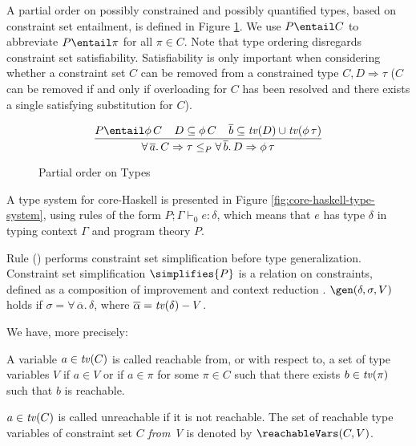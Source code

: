 A partial order on possibly constrained and possibly quantified types,
based on constraint set entailment, is defined in Figure
\ref{fig:type-partial-order}. We use $P \entail C$ to abbreviate
$P\entail \pi$ for all $\pi\in C$.  Note that type ordering disregards
constraint set satisfiability.  Satisfiability is only important when
considering whether a constraint set $C$ can be removed from a
constrained type $C,D \Rightarrow \tau$ ($C$ can be removed if and
only if overloading for $C$ has been resolved and there exists a
single satisfying substitution for
$C$)\cite{JBCS-Ambiguity-and-constrained-polymorphism}.

\begin{figure}
   \[ \begin{array}{ccc}
   	\displaystyle\frac
          {P \entail \phi\,C \:\:\:\:\: D \subseteq \phi\,C \:\:\:\:\: \overline{b} \subseteq \tv(D) \cup \tv(\phi\,\tau) }
          {\forall\,\overline{a}.\,C \Rightarrow \tau \leq_P \forall\,\overline{b}.\,D \Rightarrow \phi\,\tau}
  \end{array} \]
\caption{Partial order on Types}
\label{fig:type-partial-order}
\end{figure}

A type system for core-Haskell is presented in Figure
\ref{fig:core-haskell-type-system}, using rules of the form $P;\Gamma
\vdash_0 e:\delta$, which means that $e$ has type $\delta$ in typing
context $\Gamma$ and program theory $P$.

Rule (\LET) performs constraint set simplification before type
generalization. Constraint set simplification $\simplifies{P}$ is a
relation on cons\-traints, defined as a composition of improvement and
context reduction \cite{JBCS-Ambiguity-and-constrained-polymorphism}.
$\gen(\delta,\sigma,V)$ holds if
  $\sigma=\forall\,\overline{\alpha}.\,\delta$, where
  $\overline{\alpha}=\text{\it tv\/}(\delta) - V$.

We have, more precisely: 

\begin{Definition}

A variable $a\in \text{\it tv\/}(C)$ is called reachable from, or
with respect to, a set of type variables $V$ if $a\in V$ or if $a\in
\pi$ for some $\pi\in C$ such that there exists $b\in \text{\it tv\/}(\pi)$ such
that $b$ is reachable. 

$a\in \text{\it tv\/}(C)$ is called unreachable if it is not reachable. The set of
reachable type variables of constraint set $C$ {\em from V\/} is
denoted by $\reachableVars(C,V)$.

\label{def:reachable}
\end{Definition}

